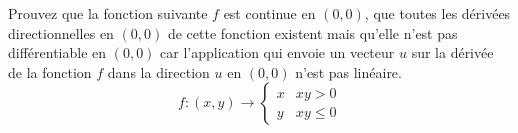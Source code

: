 
\begin{exercice}\label{exo0047}


Prouvez que la fonction suivante $f$ est continue en $(0,0)$, que
toutes les dérivées directionnelles en $(0,0)$ de cette fonction
existent mais qu'elle n'est pas différentiable en $(0,0)$ car
l'application qui envoie un vecteur $u$ sur la dérivée de la fonction
$f$ dans la direction $u$ en $(0,0)$ n'est pas linéaire.
\[
f:(x,y) \rightarrow \left\{ \begin{array}{ll}
x & xy>0 \\
y & xy  \leq 0
\end{array} \right.
\]


\end{exercice}
